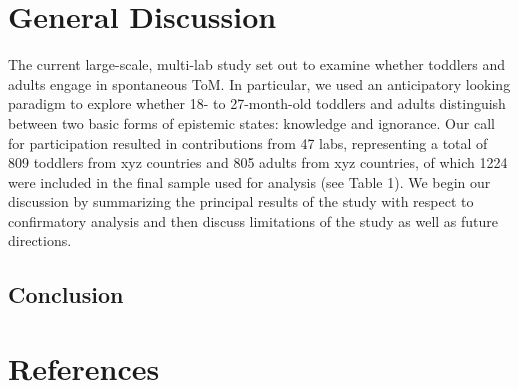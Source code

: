 \documentclass[
  english,
  man,floatsintext]{apa6}
\begin{document}
\hypertarget{general-discussion}{%
\section{General Discussion}\label{general-discussion}}

The current large-scale, multi-lab study set out to examine whether toddlers and adults engage in spontaneous ToM. In particular, we used an anticipatory looking paradigm to explore whether 18- to 27-month-old toddlers and adults distinguish between two basic forms of epistemic states: knowledge and ignorance. Our call for participation resulted in contributions from 47 labs, representing a total of 809 toddlers from xyz countries and 805 adults from xyz countries, of which 1224 were included in the final sample used for analysis (see Table 1). We begin our discussion by summarizing the principal results of the study with respect to confirmatory analysis and then discuss limitations of the study as well as future directions.

\hypertarget{conclusion}{%
\subsection{Conclusion}\label{conclusion}}

\newpage

\hypertarget{references}{%
\section{References}\label{references}}

\begingroup
\setlength{\parindent}{-0.5in}
\setlength{\leftskip}{0.5in}
\end{document}
